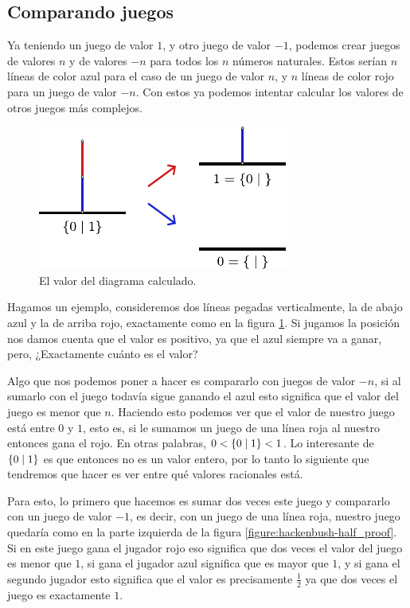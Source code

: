 \subsection{Comparando juegos}

Ya teniendo un juego de valor $1$, y otro juego de valor $-1$, podemos crear juegos de valores $n$ y de valores $-n$ para todos los $n$ n\'umeros naturales. Estos ser\'ian $n$ l\'ineas de color azul para el caso de un juego de valor $n$, y $n$ l\'ineas de color rojo para un juego de valor $-n$. Con estos ya podemos intentar calcular los valores de otros juegos m\'as complejos.

\begin{figure}[b]
    \centering
    \includegraphics[width=.5\textwidth]{images/hackenbush-half_def.pdf}
    \caption{El valor del diagrama calculado.}
    \label{figure:hackenbush-half}
\end{figure}


Hagamos un ejemplo, consideremos dos l\'ineas pegadas verticalmente, la de abajo azul y la de arriba rojo, exactamente como en la figura \ref{figure:hackenbush-half}. Si jugamos la posici\'on nos damos cuenta que el valor es positivo, ya que el azul siempre va a ganar, pero, ¿Exactamente cu\'anto es el valor?

Algo que nos podemos poner a hacer es compararlo con juegos de valor $-n$, si al sumarlo con el juego todav\'ia sigue ganando el azul esto significa que el valor del juego es menor que $n$. Haciendo esto podemos ver que el valor de nuestro juego est\'a entre $0$ y $1$, esto es, si le sumamos un juego de una l\'inea roja al nuestro entonces gana el rojo. En otras palabras, $0 < \left\{0\;\middle|\; 1\right\} < 1$. Lo interesante de $\left\{0\;\middle|\; 1\right\}$ es que entonces no es un valor entero, por lo tanto lo siguiente que tendremos que hacer es ver entre qu\'e valores racionales est\'a.

Para esto, lo primero que hacemos es sumar dos veces este juego y compararlo con un juego de valor $-1$, es decir, con un juego de una l\'inea roja, nuestro juego quedar\'ia como en la parte izquierda de la figura \ref{figure:hackenbush-half_proof}. Si en este juego gana el jugador rojo eso significa que dos veces el valor del juego es menor que $1$, si gana el jugador azul significa que es mayor que $1$, y si gana el segundo jugador esto significa que el valor es precisamente $\frac{1}{2}$ ya que dos veces el juego es exactamente $1$.

